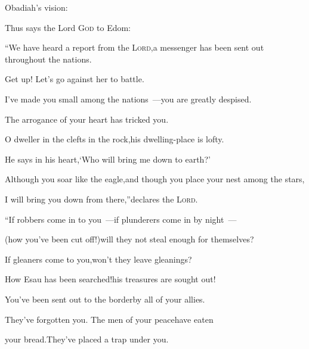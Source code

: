 
\begin{inparaenum}
  \hfil{} Obadiah's vision:\hfil%
  
  \smallskip
  \pa Thus says the Lord \textsc{God} to Edom:%
  
  \pb ``We have heard%
  a report from the \textsc{Lord},\pa a messenger has been sent out throughout the nations.%
  
  \pb Get up! Let's go against her to battle.%
  
  \pa {} I've made you small among the nations~---\pa you are greatly despised.%
  
  \pa {} The arrogance%
  of your heart has tricked you.%
  
  \pb O dweller in the clefts in the rock,\pa his dwelling-place is lofty.%
  
  \pb He says in his heart,\pa `Who will bring me down to earth?'%
  
  \pa {} Although you soar like the eagle,\pa and though you place your nest among the stars,%
  
  \pb I will bring you down from there,''\pa declares the \textsc{Lord}.%
  
  \pb {} ``If robbers come in to you~---\pa if plunderers come in by night~---%
  
  \pc (how you've been cut off!)\pa will they not steal enough for themselves?%
  
  \pc If gleaners come to you,\pa won't they leave gleanings?%
  
  \pb {} How Esau has been searched!\pa his treasures are sought out!%
  
  \pb {} You've been sent out to the border\pa by all of your allies.%
  
  \pc They've forgotten you. The men of your peace\pa have eaten%
  
  \pc your bread.\pa They've placed a trap%
  under you.%
  

\end{inparaenum}

